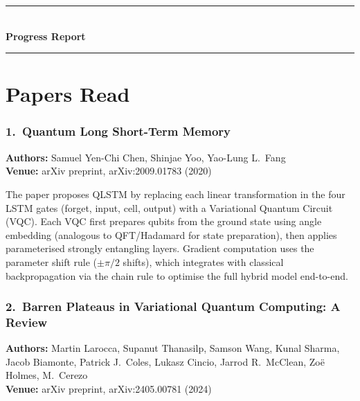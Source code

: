 \documentclass[10pt,twocolumn]{article}
\begin{document}

\vspace{6pt}
\begin{center}
\rule{0.8\linewidth}{0.8pt}\\[4pt]
{\large\bfseries\color{accentblue} Progress Report}\\[2pt]
\rule{0.8\linewidth}{0.8pt}
\end{center}
\vspace{4pt}


\section{Papers Read}

\subsubsection*{1.\ Quantum Long Short-Term Memory}
\textbf{Authors:} Samuel Yen-Chi Chen, Shinjae Yoo, Yao-Lung L.\ Fang\\
\textbf{Venue:} arXiv preprint, arXiv:2009.01783 (2020)

The paper proposes QLSTM by replacing each linear transformation in the four LSTM gates (forget, input, cell, output) with a Variational Quantum Circuit (VQC). Each VQC first prepares qubits from the ground state using angle embedding (analogous to QFT/Hadamard for state preparation), then applies parameterised strongly entangling layers. Gradient computation uses the parameter shift rule ($\pm\pi/2$ shifts), which integrates with classical backpropagation via the chain rule to optimise the full hybrid model end-to-end.

\subsubsection*{2.\ Barren Plateaus in Variational Quantum Computing: A Review}
\textbf{Authors:} Martin Larocca, Supanut Thanasilp, Samson Wang, Kunal Sharma, Jacob Biamonte, Patrick J.\ Coles, Lukasz Cincio, Jarrod R.\ McClean, Zo\"{e} Holmes, M.\ Cerezo\\
\textbf{Venue:} arXiv preprint, arXiv:2405.00781 (2024)
\end{document}
